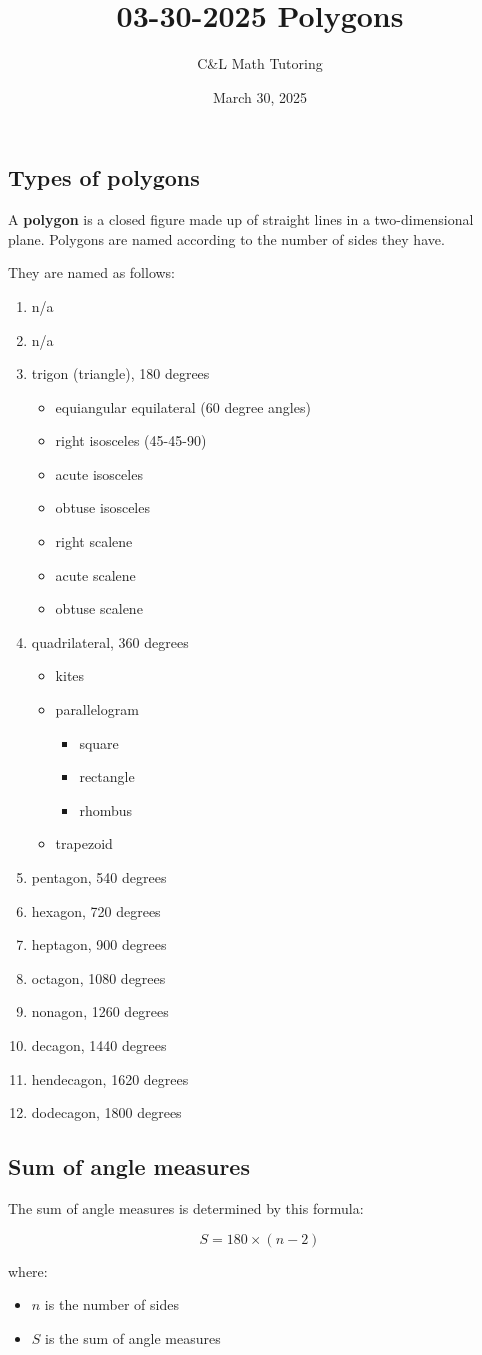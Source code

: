 \documentclass[a4paper, 12pt]{article}
\title{03-30-2025 Polygons}
\author{C\&L Math Tutoring}
\date{March 30, 2025}
\begin{document}
\maketitle

\subsection*{Types of polygons}

A \textbf{polygon} is a closed figure made up of straight lines in a two-dimensional plane. Polygons are named according to the number of sides they have.

They are named as follows:

\begin{enumerate}
	\item n/a
	\item n/a
	\item trigon (triangle), 180 degrees
	\begin{itemize}
	\item equiangular equilateral (60 degree angles)
	\item right isosceles (45-45-90)
	\item acute isosceles
	\item obtuse isosceles
	\item right scalene
	\item acute scalene
	\item obtuse scalene
	\end{itemize}
	\item quadrilateral, 360 degrees
	\begin{itemize}
	\item kites
	\item parallelogram
	\begin{itemize}
	\item square
	\item rectangle
	\item rhombus
	\end{itemize}
	\item trapezoid
	\end{itemize}
	\item pentagon, 540 degrees
	\item hexagon, 720 degrees
	\item heptagon, 900 degrees
	\item octagon, 1080 degrees
	\item nonagon, 1260 degrees
	\item decagon, 1440 degrees
	\item hendecagon, 1620 degrees
	\item dodecagon, 1800 degrees
\end{enumerate}

\subsection*{Sum of angle measures}
The sum of angle measures is determined by this formula:

$$S = 180 \times (n-2)$$

where:
\begin{itemize}
\item $n$ is the number of sides
\item $S$ is the sum of angle measures
\end{itemize}
\end{document}
